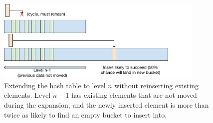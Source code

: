 \begin{figure}
\centering
\hspace*{1mm}
\includegraphics[width=100mm]{fig/cuckoo_rehash}
\caption{Extending the hash table to level $n$ without reinserting existing
elements. Level $n-1$ has existing elements that are not moved during the
expansion, and the newly inserted element is more than twice as likely to find
an empty bucket to insert into.}
\label{fig:rehash}
\end{figure}

